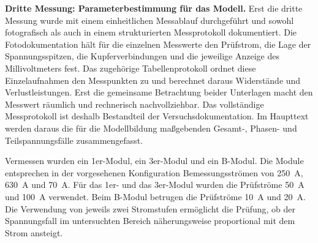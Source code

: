 
\noindent\textbf{Dritte Messung: Parameterbestimmung für das Modell.}
Erst die dritte Messung wurde mit einem einheitlichen Messablauf durchgeführt
und sowohl fotografisch als auch in einem strukturierten Messprotokoll
dokumentiert. Die Fotodokumentation hält für die einzelnen Messwerte den
Prüfstrom, die Lage der Spannungsspitzen, die Kupferverbindungen und die
jeweilige Anzeige des Millivoltmeters fest. Das zugehörige Tabellenprotokoll
ordnet diese Einzelaufnahmen den Messpunkten zu und berechnet daraus
Widerstände und Verlustleistungen. Erst die gemeinsame Betrachtung beider
Unterlagen macht den Messwert räumlich und rechnerisch nachvollziehbar.
Das vollständige Messprotokoll ist deshalb Bestandteil der
Versuchsdokumentation. Im Haupttext werden daraus die für die Modellbildung
maßgebenden Gesamt-, Phasen- und Teilspannungsfälle zusammengefasst.

Vermessen wurden ein 1er-Modul, ein 3er-Modul und ein B-Modul. Die Module
entsprechen in der vorgesehenen Konfiguration Bemessungsströmen von
\SI{250}{\ampere}, \SI{630}{\ampere} und \SI{70}{\ampere}. Für das
1er- und das 3er-Modul wurden die Prüfströme
\SI{50}{\ampere} und \SI{100}{\ampere} verwendet. Beim B-Modul betrugen
die Prüfströme \SI{10}{\ampere} und \SI{20}{\ampere}. Die Verwendung von
jeweils zwei Stromstufen ermöglicht die Prüfung, ob der Spannungsfall im
untersuchten Bereich näherungsweise proportional mit dem Strom ansteigt.

